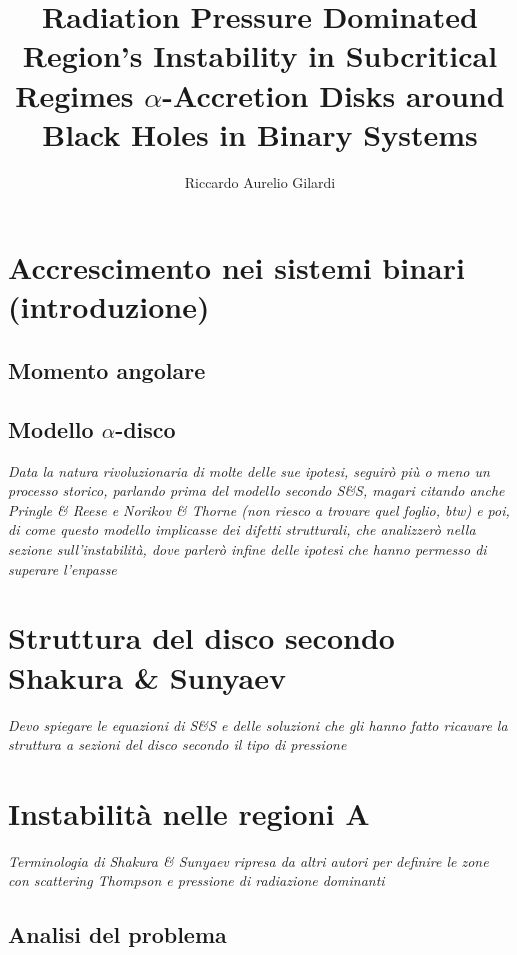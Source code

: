 \documentclass[a4paper]{article}
\newcommand{\subtitle}[1]{%
	\posttitle{%
		\par\end{center}
	\begin{center}\large#1\end{center}
	\vskip0.5em}%
}
\begin{document}
\title{Radiation Pressure Dominated Region's Instability in Subcritical Regimes $\alpha$-Accretion Disks around Black Holes in Binary Systems}
\subtitle{Appunti}
\author{Riccardo Aurelio Gilardi}
\maketitle

\tableofcontents
\newpage

\section{Accrescimento nei sistemi binari (introduzione)}
	\subsection{Momento angolare}
	\subsection{Modello $\alpha$-disco}
	
		\emph{Data la natura rivoluzionaria di molte delle sue ipotesi, seguirò più o meno un processo storico, parlando prima del modello secondo S\&S, magari citando anche Pringle \& Reese e Norikov \& Thorne (non riesco a trovare quel foglio, btw) e poi, di come questo modello implicasse dei difetti strutturali, che analizzerò nella sezione sull'instabilità, dove parlerò infine delle ipotesi che hanno permesso di superare l'enpasse}

\section{Struttura del disco secondo Shakura \& Sunyaev}

	\emph{Devo spiegare le equazioni di S\&S e delle soluzioni che gli hanno fatto ricavare la struttura a sezioni del disco secondo il tipo di pressione}

\section{Instabilità nelle regioni A}

	\emph{Terminologia di Shakura \& Sunyaev ripresa da altri autori per definire le zone con scattering Thompson e pressione di radiazione dominanti}\\
	

	\subsection{Analisi del problema}
\end{document}
